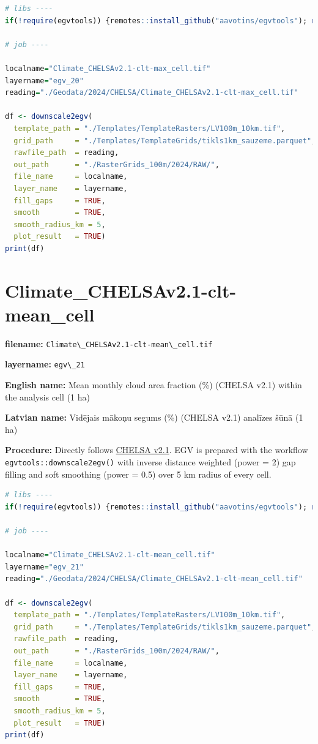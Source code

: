 \documentclass[
]{book}
\newcommand{\passthrough}[1]{#1}
\begin{document}
\begin{lstlisting}[language=R]
# libs ----
if(!require(egvtools)) {remotes::install_github("aavotins/egvtools"); require(egvtools)}

# job ----

localname="Climate_CHELSAv2.1-clt-max_cell.tif"
layername="egv_20"
reading="./Geodata/2024/CHELSA/Climate_CHELSAv2.1-clt-max_cell.tif"

df <- downscale2egv(
  template_path = "./Templates/TemplateRasters/LV100m_10km.tif",
  grid_path     = "./Templates/TemplateGrids/tikls1km_sauzeme.parquet",
  rawfile_path  = reading,
  out_path      = "./RasterGrids_100m/2024/RAW/",
  file_name     = localname,
  layer_name    = layername,
  fill_gaps     = TRUE,
  smooth        = TRUE,
  smooth_radius_km = 5,
  plot_result   = TRUE)
print(df)
\end{lstlisting}

\section{Climate\_CHELSAv2.1-clt-mean\_cell}\label{ch06.021}

\textbf{filename:} \passthrough{\lstinline!Climate\_CHELSAv2.1-clt-mean\_cell.tif!}

\textbf{layername:} \passthrough{\lstinline!egv\_21!}

\textbf{English name:} Mean monthly cloud area fraction (\%) (CHELSA v2.1) within the analysis cell (1 ha)

\textbf{Latvian name:} Vidējais mākoņu segums (\%) (CHELSA v2.1) analīzes šūnā (1 ha)

\textbf{Procedure:} Directly follows \hyperref[Ch04.11]{CHELSA v2.1}. EGV is prepared with the
workflow \passthrough{\lstinline!egvtools::downscale2egv()!} with inverse distance weighted (power = 2)
gap filling and soft smoothing (power = 0.5) over 5 km radius of every cell.

\begin{lstlisting}[language=R]
# libs ----
if(!require(egvtools)) {remotes::install_github("aavotins/egvtools"); require(egvtools)}

# job ----

localname="Climate_CHELSAv2.1-clt-mean_cell.tif"
layername="egv_21"
reading="./Geodata/2024/CHELSA/Climate_CHELSAv2.1-clt-mean_cell.tif"

df <- downscale2egv(
  template_path = "./Templates/TemplateRasters/LV100m_10km.tif",
  grid_path     = "./Templates/TemplateGrids/tikls1km_sauzeme.parquet",
  rawfile_path  = reading,
  out_path      = "./RasterGrids_100m/2024/RAW/",
  file_name     = localname,
  layer_name    = layername,
  fill_gaps     = TRUE,
  smooth        = TRUE,
  smooth_radius_km = 5,
  plot_result   = TRUE)
print(df)
\end{lstlisting}
\end{document}
